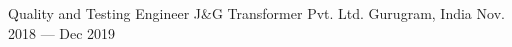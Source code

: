 
\begin{cventries}


\cventry
{Quality and Testing Engineer}
{J\&G Transformer Pvt. Ltd. }
{Gurugram, India}
{Nov. 2018 --- Dec 2019}
{
	\begin{cvitems}
	\item {}
	\item {}
	\end{cvitems}
}




\end{cventries}
